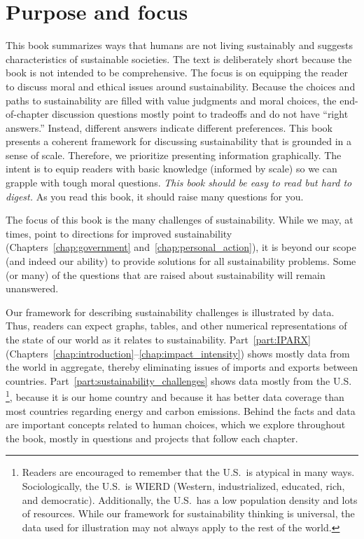 \documentclass{article}\usepackage[]{graphicx}\usepackage[table]{xcolor}
\begin{document}
\section{Purpose and focus}

This book summarizes ways that humans are not living sustainably and suggests
characteristics of sustainable societies.
The text is deliberately short because the book is not intended to be comprehensive.
The focus is on equipping the reader to discuss moral and ethical issues around sustainability.
Because the choices and paths to sustainability are filled with value judgments and moral choices,
the end-of-chapter discussion questions mostly point to tradeoffs and do not have ``right answers.''
Instead, different answers indicate different preferences.
This book presents a coherent framework for discussing sustainability
that is grounded in a sense of scale.
Therefore, we prioritize presenting information graphically.
The intent is to equip readers with basic knowledge (informed by scale) so we can
grapple with tough moral questions.
\emph{This book should be easy to read but hard to digest.}
As you read this book, it should raise many questions for you.

The focus of this book is the many challenges of sustainability.
While we may, at times, point to directions for improved sustainability
(Chapters~\ref{chap:government} and~\ref{chap:personal_action}),
it is beyond our scope
(and indeed our ability) to provide solutions for all sustainability problems.
Some (or many) of the questions that are raised about sustainability
will remain unanswered.

Our framework for describing sustainability challenges
is illustrated by data.
Thus, readers can expect graphs, tables, and other numerical representations
of the state of our world as it relates to sustainability.
Part~\ref{part:IPARX} (Chapters~\ref{chap:introduction}--\ref{chap:impact_intensity})
shows mostly data from the world in aggregate, thereby eliminating issues of
imports and exports between countries.
Part~\ref{part:sustainability_challenges} shows data mostly from the U.S.%
\footnote{
  Readers are encouraged to remember that the U.S.\ is atypical in many ways.
  Sociologically, the U.S.\ is WIERD
    (Western, industrialized, educated, rich, and democratic).
  Additionally, the U.S.\ has a low population density
  and lots of resources.
  While our framework for sustainability thinking is universal, the data used for
  illustration may not always apply to the rest of the world.
},
because it is our home country and
because it has better data coverage than most countries
regarding energy and carbon emissions.
Behind the facts and data are important concepts related to human choices,
which we explore throughout the book, mostly in questions and projects that follow each chapter.
\end{document}
